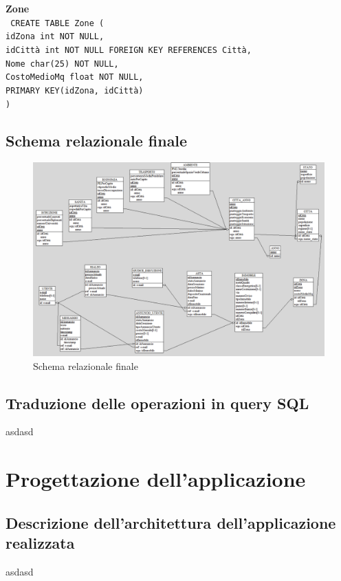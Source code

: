\documentclass[a4paper,12pt]{report}
\begin{document}
                \noindent
                {\large \textbf{Zone}} \\
                \texttt{
                    CREATE TABLE Zone ( \\
                    \null\quad\quad idZona int NOT NULL, \\
                    \null\quad\quad idCittà int NOT NULL FOREIGN KEY REFERENCES Città, \\
                    \null\quad\quad Nome char(25) NOT NULL, \\
                    \null\quad\quad CostoMedioMq float NOT NULL, \\
                    \null\quad\quad PRIMARY KEY(idZona, idCittà) \\
                    )
                } \\

            \section{Schema relazionale finale}
                \begin{figure}[H]
                    \centering{}
                    \includegraphics[width=\linewidth]{./images/relational_scheme.png}
                    \caption{Schema relazionale finale}
            \end{figure}
                
            \section{Traduzione delle operazioni in query SQL}
                asdasd
            
            
        \chapter{Progettazione dell'applicazione}
            
    	\section{Descrizione dell'architettura dell'applicazione realizzata}
        	asdasd
 
\end{document}
